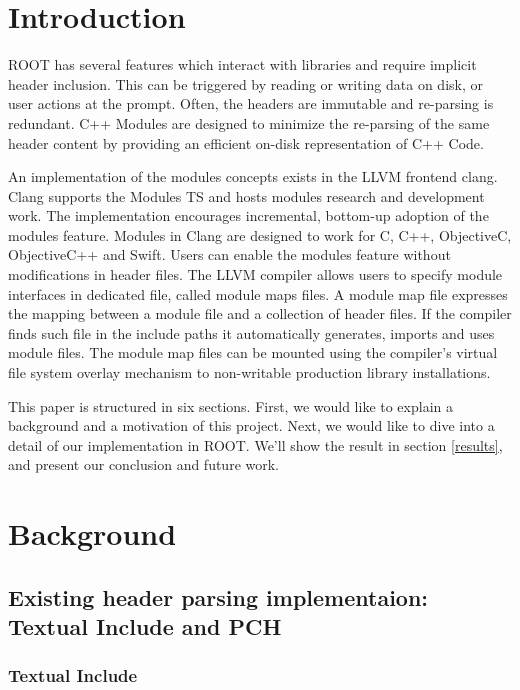 \documentclass{webofc}
\begin{document}
\section{Introduction}
\label{intro}

ROOT has several features which interact with libraries and require implicit header inclusion. This can be triggered by reading or writing data on disk, or user actions at the prompt. Often, the headers are immutable and re-parsing is redundant. C++ Modules are designed to minimize the re-parsing of the same header content by providing an efficient on-disk representation of C++ Code.

An implementation of the modules concepts exists in the LLVM frontend clang. Clang supports the Modules TS and hosts modules research and development work. The implementation encourages incremental, bottom-up adoption of the modules feature. Modules in Clang are designed to work for C, C++, ObjectiveC, ObjectiveC++ and Swift. Users can enable the modules feature without modifications in header files. The LLVM compiler allows users to specify module interfaces in dedicated file, called module maps files. A module map file expresses the mapping between a module file and a collection of header files. If the compiler finds such file in the include paths it automatically generates, imports and uses module files. The module map files can be mounted using the compiler’s virtual file system overlay mechanism to non-writable production library installations.

This paper is structured in six sections. First, we would like to explain a background and a motivation of this project. Next, we would like to dive into a detail of our implementation in ROOT. We'll show the result in section \ref{results}, and present our conclusion and future work.

\section{Background}
\label{background}

\subsection{Existing header parsing implementaion: Textual Include and PCH}
\label{tandpch}

\subsubsection{Textual Include}
\end{document}
